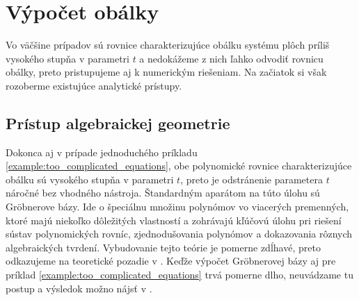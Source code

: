 
\section{Výpočet obálky}
Vo väčšine prípadov sú rovnice charakterizujúce obálku systému plôch príliš vysokého stupňa v parametri $t$ a nedokážeme z nich ľahko odvodiť rovnicu obálky, preto pristupujeme aj k numerickým riešeniam. Na začiatok si však rozoberme existujúce analytické prístupy.
\subsection{Prístup algebraickej geometrie}
Dokonca aj v prípade jednoduchého príkladu \ref{example:too_complicated_equations}, obe polynomické rovnice charakterizujúce obálku sú vysokého stupňa v parametri $t$, preto je odstránenie parametera $t$ náročné bez vhodného nástroja. Štandardným aparátom na túto úlohu sú Gröbnerove bázy. Ide o špeciálnu množinu polynómov vo viacerých premenných, ktoré majú niekoľko dôležitých vlastností a zohrávajú kľúčovú úlohu pri riešení sústav polynomických rovníc, zjednodušovania polynómov a dokazovania rôznych algebraických tvrdení. Vybudovanie tejto teórie je pomerne zdĺhavé, preto odkazujeme na teoretické pozadie v \cite{Chalm}.
Keďže výpočet Gröbnerovej bázy aj pre príklad \ref{example:too_complicated_equations} trvá pomerne dlho, neuvádzame tu postup a výsledok možno nájsť v . 


